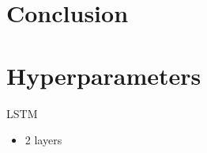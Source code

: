 \documentclass[11pt,a4paper]{article}
\begin{document}
\begin{comment}
\subsection{Part-of-Speech Tagging}

\begin{table*}[!t]
\centering
\begin{tabular}{llll}
\toprule
Model                               & Num params & Valid Acc & Test Acc\\
\midrule
BRNN \citep{ma2016crf}              & -          & 96.56     & 96.76    \\ 
BLSTM \citep{ma2016crf}             & -          & 96.88     & 96.93    \\ 
BLSTM + CNN \citep{ma2016crf}       & -          & 97.34     & 97.33    \\ 
BLSTM + CNN + CRF \citep{ma2016crf} & -          & 97.46     & 97.55    \\ 
\midrule
HMM                                 & 19M        & 96.25     & 96.50    \\
HMM + CNN Emit                      & 9M         & 96.73     & 96.95    \\
\bottomrule
\end{tabular}
\caption{\label{tbl:pos}
Tagging accuracies on the Wall Street Journal (WSJ) portion of the
\texttt{Penn Treebank}.
We use a HMM with 32k states and 0.5 state dropout.
}
\end{table*}

We find in Tbl.~\ref{tbl:pos} that the HMM outperforms the BRNN and BLSTM baselines
of \citep{ma2016crf}, but underperforms the BLSTM with CNN and CRF variants.
Additionally,
we found that incorporating pretrained embeddings in the HMMs did not improve performance.
{\color{red} NEED ERROR ANALYSIS}
\end{comment}

\section{Conclusion}




\appendix

\section{Hyperparameters}
\label{sec:hyperparams}
LSTM
\begin{itemize}
\item 2 layers
\end{itemize}
\end{document}
